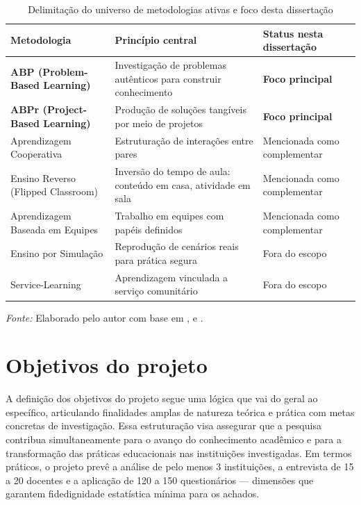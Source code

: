 \begin{table}[htbp]
    \centering
    \caption{Delimitação do universo de metodologias ativas e foco desta dissertação}
    \label{tab:metodologias_ativas_universo}
    \small
    \begin{tabular}{p{4cm} p{4.5cm} p{4.5cm}}
        \toprule
        \textbf{Metodologia} & \textbf{Princípio central} & \textbf{Status nesta dissertação} \\
        \midrule
        \textbf{ABP (Problem-Based Learning)} & Investigação de problemas autênticos para construir conhecimento & \textbf{Foco principal} \\
        \addlinespace
        \textbf{ABPr (Project-Based Learning)} & Produção de soluções tangíveis por meio de projetos & \textbf{Foco principal} \\
        \addlinespace
        Aprendizagem Cooperativa & Estruturação de interações entre pares & Mencionada como complementar \\
        \addlinespace
        Ensino Reverso (Flipped Classroom) & Inversão do tempo de aula: conteúdo em casa, atividade em sala & Mencionada como complementar \\
        \addlinespace
        Aprendizagem Baseada em Equipes & Trabalho em equipes com papéis definidos & Mencionada como complementar \\
        \addlinespace
        Ensino por Simulação & Reprodução de cenários reais para prática segura & Fora do escopo \\
        \addlinespace
        Service-Learning & Aprendizagem vinculada a serviço comunitário & Fora do escopo \\
        \bottomrule
    \end{tabular}
    \par\medskip
    \footnotesize{\textit{Fonte:} Elaborado pelo autor com base em \cite{BONWELL1991}, \cite{BARROWS1996} e \cite{BARRON1998}.}
\end{table}


\section{Objetivos do projeto}
\label{sec:objetivos_projeto}

A definição dos objetivos do projeto segue uma lógica que vai do geral ao específico, articulando finalidades amplas de natureza teórica e prática com metas concretas de investigação. Essa estruturação visa assegurar que a pesquisa contribua simultaneamente para o avanço do conhecimento acadêmico e para a transformação das práticas educacionais nas instituições investigadas. Em termos práticos, o projeto prevê a análise de pelo menos 3 instituições, a entrevista de 15 a 20 docentes e a aplicação de 120 a 150 questionários — dimensões que garantem fidedignidade estatística mínima para os achados.

